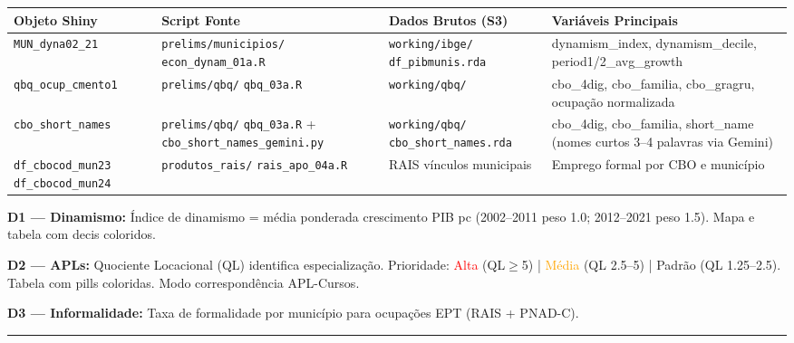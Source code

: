 \documentclass[10pt]{article}
\begin{document}
	\begin{center}
		\small
		\begin{tabular}{p{3.5cm}p{4.5cm}p{5cm}p{9cm}}
			\toprule
			\textbf{Objeto Shiny} & \textbf{Script Fonte} & \textbf{Dados Brutos (S3)} & \textbf{Variáveis Principais} \\
			\midrule
			\texttt{MUN\_dyna02\_21} & \texttt{prelims/municipios/} \newline \texttt{econ\_dynam\_01a.R} & \texttt{working/ibge/} \newline \texttt{df\_pibmunis.rda} & dynamism\_index, dynamism\_decile, period1/2\_avg\_growth \\
			\texttt{qbq\_ocup\_cmento1} & \texttt{prelims/qbq/} \newline \texttt{qbq\_03a.R} & \texttt{working/qbq/} & cbo\_4dig, cbo\_familia, cbo\_gragru, ocupação normalizada \\
			\texttt{cbo\_short\_names} & \texttt{prelims/qbq/} \newline \texttt{qbq\_03a.R} + \newline \texttt{cbo\_short\_names\_gemini.py} & \texttt{working/qbq/} \newline \texttt{cbo\_short\_names.rda} & cbo\_4dig, cbo\_familia, short\_name (nomes curtos 3--4 palavras via Gemini) \\
			\texttt{df\_cbocod\_mun23} \newline \texttt{df\_cbocod\_mun24} & \texttt{produtos\_rais/} \newline \texttt{rais\_apo\_04a.R} & RAIS vínculos municipais & Emprego formal por CBO e município \\
			\bottomrule
		\end{tabular}
	\end{center}
	
	\noindent\textbf{D1 --- Dinamismo:} Índice de dinamismo = média ponderada crescimento PIB pc (2002--2011 peso 1.0; 2012--2021 peso 1.5). Mapa e tabela com decis coloridos.
	
	\noindent\textbf{D2 --- APLs:} Quociente Locacional (QL) identifica especialização. Prioridade: \textcolor{red}{Alta} (QL$\geq$5) | \textcolor{orange}{Média} (QL 2.5--5) | \textcolor{green!60!black}{Padrão} (QL 1.25--2.5). Tabela com pills coloridas. Modo correspondência APL-Cursos.
	
	\noindent\textbf{D3 --- Informalidade:} Taxa de formalidade por município para ocupações EPT (RAIS + PNAD-C).
	
	\vspace{0.8em}
	\hrule
	\vspace{0.8em}
	
\end{document}
